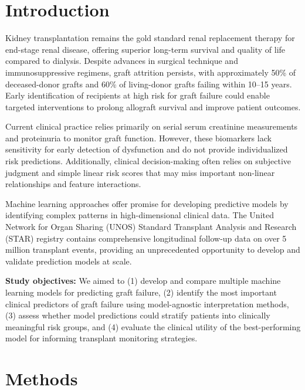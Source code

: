 \documentclass[11pt,a4paper]{article}
\begin{document}
\section{Introduction}

Kidney transplantation remains the gold standard renal replacement therapy for end-stage renal disease, offering superior long-term survival and quality of life compared to dialysis.\cite{Wolfe1999} Despite advances in surgical technique and immunosuppressive regimens, graft attrition persists, with approximately 50\% of deceased-donor grafts and 60\% of living-donor grafts failing within 10–15 years.\cite{Hart2019} Early identification of recipients at high risk for graft failure could enable targeted interventions to prolong allograft survival and improve patient outcomes.

Current clinical practice relies primarily on serial serum creatinine measurements and proteinuria to monitor graft function. However, these biomarkers lack sensitivity for early detection of dysfunction and do not provide individualized risk predictions.\cite{Halloran2004} Additionally, clinical decision-making often relies on subjective judgment and simple linear risk scores that may miss important non-linear relationships and feature interactions.

Machine learning approaches offer promise for developing predictive models by identifying complex patterns in high-dimensional clinical data.\cite{Rajkomar2018} The United Network for Organ Sharing (UNOS) Standard Transplant Analysis and Research (STAR) registry contains comprehensive longitudinal follow-up data on over 5 million transplant events, providing an unprecedented opportunity to develop and validate prediction models at scale.

\textbf{Study objectives:} We aimed to (1) develop and compare multiple machine learning models for predicting graft failure, (2) identify the most important clinical predictors of graft failure using model-agnostic interpretation methods, (3) assess whether model predictions could stratify patients into clinically meaningful risk groups, and (4) evaluate the clinical utility of the best-performing model for informing transplant monitoring strategies.

\section{Methods}
\end{document}

